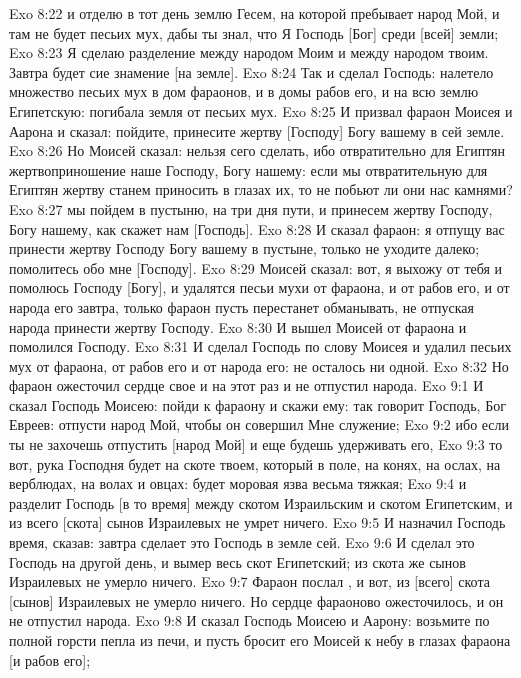 \vs Exo 8:22 и отделю в тот день землю Гесем, на которой пребывает народ Мой, и там не будет песьих мух, дабы ты знал, что Я Господь [Бог] среди [всей] земли;
\vs Exo 8:23 Я сделаю разделение между народом Моим и между народом твоим. Завтра будет сие знамение [на земле].
\vs Exo 8:24 Так и сделал Господь: налетело множество песьих мух в дом фараонов, и в домы рабов его, и на всю землю Египетскую: погибала земля от песьих мух.
\vs Exo 8:25 И призвал фараон Моисея и Аарона и сказал: пойдите, принесите жертву [Господу] Богу вашему в сей земле.
\vs Exo 8:26 Но Моисей сказал: нельзя сего сделать, ибо отвратительно для Египтян жертвоприношение наше Господу, Богу нашему: если мы отвратительную для Египтян жертву станем приносить в глазах их, то не побьют ли они нас камнями?
\vs Exo 8:27 мы пойдем в пустыню, на три дня пути, и принесем жертву Господу, Богу нашему, как скажет нам [Господь].
\vs Exo 8:28 И сказал фараон: я отпущу вас принести жертву Господу Богу вашему в пустыне, только не уходите далеко; помолитесь обо мне [Господу].
\vs Exo 8:29 Моисей сказал: вот, я выхожу от тебя и помолюсь Господу [Богу], и удалятся песьи мухи от фараона, и от рабов его, и от народа его завтра, только фараон пусть перестанет обманывать, не отпуская народа принести жертву Господу.
\vs Exo 8:30 И вышел Моисей от фараона и помолился Господу.
\vs Exo 8:31 И сделал Господь по слову Моисея и удалил песьих мух от фараона, от рабов его и от народа его: не осталось ни одной.
\vs Exo 8:32 Но фараон ожесточил сердце свое и на этот раз и не отпустил народа.
\vs Exo 9:1 И сказал Господь Моисею: пойди к фараону и скажи ему: так говорит Господь, Бог Евреев: отпусти народ Мой, чтобы он совершил Мне служение;
\vs Exo 9:2 ибо если ты не захочешь отпустить [народ Мой] и еще будешь удерживать его,
\vs Exo 9:3 то вот, рука Господня будет на скоте твоем, который в поле, на конях, на ослах, на верблюдах, на волах и овцах: будет моровая язва весьма тяжкая;
\vs Exo 9:4 и разделит Господь [в то время] между скотом Израильским и скотом Египетским, и из всего [скота] сынов Израилевых не умрет ничего.
\vs Exo 9:5 И назначил Господь время, сказав: завтра сделает это Господь в земле сей.
\vs Exo 9:6 И сделал это Господь на другой день, и вымер весь скот Египетский; из скота же сынов Израилевых не умерло ничего.
\vs Exo 9:7 Фараон послал , и вот, из [всего] скота [сынов] Израилевых не умерло ничего. Но сердце фараоново ожесточилось, и он не отпустил народа.
\rsbpar\vs Exo 9:8 И сказал Господь Моисею и Аарону: возьмите по полной горсти пепла из печи, и пусть бросит его Моисей к небу в глазах фараона [и рабов его];
